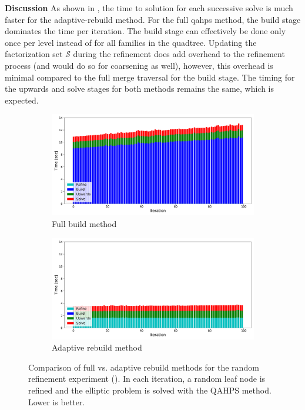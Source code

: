 {\bf Discussion}
As shown in , the time to solution for each successive solve is much faster for the adaptive-rebuild method. For the full \gls{qahps} method, the build stage dominates the time per iteration. The build stage can effectively be done only once per level instead of for all families in the quadtree. Updating the factorization set $\mathcal{S}$ during the refinement does add overhead to the refinement process (and would do so for coarsening as well), however, this overhead is minimal compared to the full merge traversal for the build stage. The timing for the upwards and solve stages for both methods remains the same, which is expected.

\begin{figure}
    \centering
    \begin{subfigure}[t]{1\textwidth}
        \includegraphics[width=\textwidth, clip=true, trim={10 10 10 10}]{figures/full-stacked-bar-no-title.pdf}
        \caption{Full build method}
        \label{fig:full-time-comparison}
    \end{subfigure}
    \begin{subfigure}[t]{1\textwidth}
        \includegraphics[width=\textwidth, clip=true, trim={10 10 10 10}]{figures/adaptive-stacked-bar-no-title.pdf}
        \caption{Adaptive rebuild method}
        \label{fig:adaptive-time-comparison}
    \end{subfigure}
    \caption{Comparison of full vs. adaptive rebuild methods for the random refinement experiment (). In each iteration, a random leaf node is refined and the elliptic problem is solved with the QAHPS method. Lower is better.}
    \label{fig:full-vs-adaptive-time-comparison}
\end{figure}